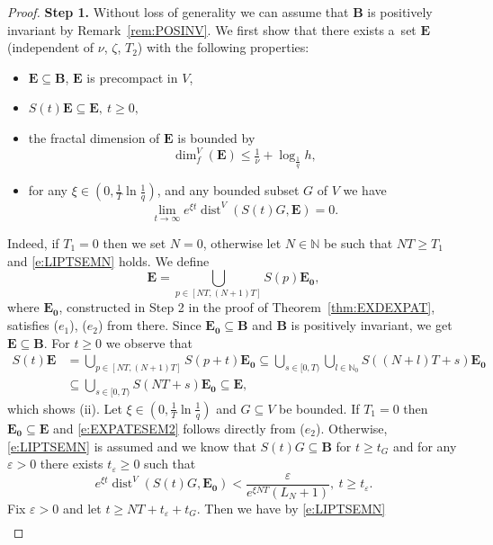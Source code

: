 \documentclass[10pt,a4paper]{amsart}
\newcommand{\N}{\mathbb{N}}
\newcommand{\dimf}{\operatorname{dim}_{f}}
\newcommand{\dist}{\operatorname{dist}}
\newcommand{\eps}{\varepsilon}
\renewcommand{\geq}{\geqslant}
\renewcommand{\leq}{\leqslant}
\begin{document}
\begin{proof}
\textbf{Step 1.} Without loss of generality we can assume that $\mathbf{B}$ is positively invariant by Remark~\ref{rem:POSINV}. We first show that there exists a~set $\mathbf{E}$ (independent of $\nu$, $\zeta$, $T_2$) with the following properties:
\begin{itemize}
\item[(i)] $\mathbf{E}\subseteq\mathbf{B}$, $\mathbf{E}$ is precompact in $V$,
\item[(ii)] $S(t)\mathbf{E}\subseteq\mathbf{E},\ t\geq 0,$
\item[(iii)] the fractal dimension of $\mathbf{E}$ is bounded by
\begin{equation*}
\dimf^{V}(\mathbf{E})\leq\tfrac{1}{\nu}+\log_{\frac{1}{q}}h,
\end{equation*}
\item[(iv)] for any $\xi\in(0,\frac{1}{T}\ln\frac{1}{q})$,
and any bounded subset $G$ of $V$ we have
\begin{equation}\label{e:EXPATESEM2}
\lim_{t\rightarrow\infty}e^{\xi t}\dist^{V}(S(t)G,\mathbf{E})=0.
\end{equation}
\end{itemize}
Indeed, if $T_1=0$ then we set $N=0$, otherwise let $N\in\N$ be such that $NT\geq T_1$
and \eqref{e:LIPTSEMN} holds. We define
$$\mathbf{E}=\bigcup_{p\in[NT,(N+1)T]}S(p)\mathbf{E_0},$$
where $\mathbf{E_0}$, constructed in Step 2 in the proof of Theorem~\ref{thm:EXDEXPAT}, satisfies ($e_1$), ($e_2$) from there. Since $\mathbf{E_0}\subseteq \mathbf{B}$
and $\mathbf{B}$ is positively invariant, we get $\mathbf{E}\subseteq \mathbf{B}$. For $t\geq 0$ we observe that
\begin{align*}
S(t)\mathbf{E}&=\bigcup_{p\in[NT,(N+1)T]}S(p+t)\mathbf{E_0}\subseteq\bigcup_{s\in[0,T)}\bigcup_{l\in\N_0}S((N+l)T+s)\mathbf{E_0}\\
&\subseteq\bigcup_{s\in[0,T)}S(NT+s)\mathbf{E_0}\subseteq\mathbf{E},
\end{align*}
which shows (ii).
Let $\xi\in(0,\frac{1}{T}\ln\frac{1}{q})$ and $G\subseteq V$ be bounded.
If $T_1=0$ then $\mathbf{E_0}\subseteq\mathbf{E}$ and \eqref{e:EXPATESEM2} follows directly from
($e_2$). Otherwise, \eqref{e:LIPTSEMN} is assumed and we
know that $S(t)G\subseteq\mathbf{B}$ for $t\geq t_{G}$ and for any $\eps>0$ there exists $t_\eps\geq 0$
such that
$$e^{\xi t}\dist^{V}(S(t)G,\mathbf{E_0})<\frac{\eps}{e^{\xi NT}(L_{N}+1)},\ t\geq t_\eps.$$
Fix $\eps>0$ and let $t\geq NT+t_\eps+t_{G}$. Then we have by \eqref{e:LIPTSEMN}
\begin{align*}

\end{align*}
\end{proof}
\end{document}
